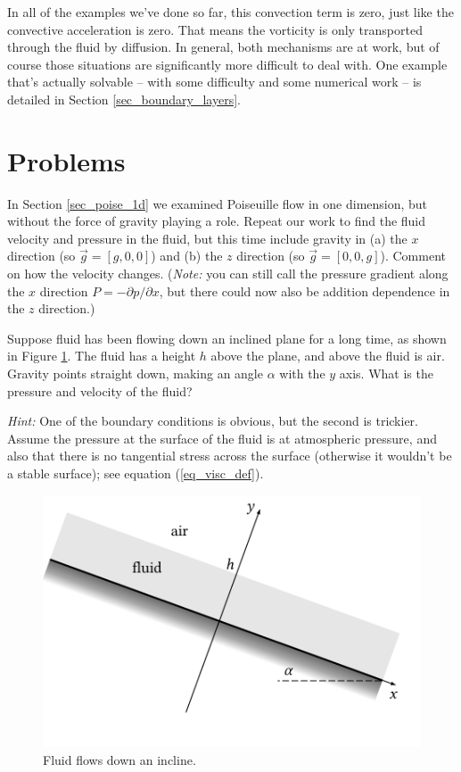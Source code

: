 In all of the examples we've done so far, this convection term is zero, just like the convective acceleration is zero.  That means the vorticity is only transported through the fluid by diffusion.  In general, both mechanisms are at work, but of course those situations are significantly more difficult to deal with.  One example that's actually solvable -- with some difficulty and some numerical work -- is detailed in Section \ref{sec_boundary_layers}.



\section*{Problems}
%


\begin{problem}
\label{prob_poise_grav}
In Section \ref{sec_poise_1d} we examined Poiseuille flow in one dimension, but without the force of gravity playing a role.  Repeat our work to find the fluid velocity and pressure in the fluid, but this time include gravity in (a) the $x$ direction (so $\vec{g} = [g,0,0]$) and (b) the $z$ direction (so $\vec{g} = [0, 0, g]$).  Comment on how the velocity changes.  (\emph{Note:} you can still call the pressure gradient along the $x$ direction $P = -\partial p / \partial x$, but there could now also be addition dependence in the $z$ direction.)
\end{problem}

\begin{problem}
Suppose fluid has been flowing down an inclined plane for a long time, as shown in Figure \ref{fig_incline_setup}.  The fluid has a height $h$ above the plane, and above the fluid is air.  Gravity points straight down, making an angle $\alpha$ with the $y$ axis.  What is the pressure and velocity of the fluid?  

\emph{Hint:} One of the boundary conditions is obvious, but the second is trickier.  Assume the pressure at the surface of the fluid is at atmospheric pressure, and also that there is no tangential stress across the surface (otherwise it wouldn't be a stable surface); see equation (\ref{eq_visc_def}).
\end{problem}

\begin{figure}
\centering
\includegraphics[width=0.7\linewidth]{Figures/Chapter2/fig_incline_setup}
\caption{Fluid flows down an incline.}
\label{fig_incline_setup}
\end{figure}

